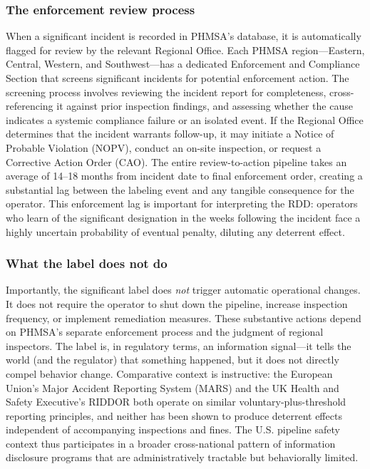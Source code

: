 \documentclass[12pt]{article}
\begin{document}
\subsubsection*{The enforcement review process} When a significant incident is recorded in PHMSA's database, it is automatically flagged for review by the relevant Regional Office. Each PHMSA region---Eastern, Central, Western, and Southwest---has a dedicated Enforcement and Compliance Section that screens significant incidents for potential enforcement action. The screening process involves reviewing the incident report for completeness, cross-referencing it against prior inspection findings, and assessing whether the cause indicates a systemic compliance failure or an isolated event. If the Regional Office determines that the incident warrants follow-up, it may initiate a Notice of Probable Violation (NOPV), conduct an on-site inspection, or request a Corrective Action Order (CAO). The entire review-to-action pipeline takes an average of 14--18 months from incident date to final enforcement order, creating a substantial lag between the labeling event and any tangible consequence for the operator. This enforcement lag is important for interpreting the RDD: operators who learn of the significant designation in the weeks following the incident face a highly uncertain probability of eventual penalty, diluting any deterrent effect.

\subsubsection*{What the label does not do} Importantly, the significant label does \textit{not} trigger automatic operational changes. It does not require the operator to shut down the pipeline, increase inspection frequency, or implement remediation measures. These substantive actions depend on PHMSA's separate enforcement process and the judgment of regional inspectors. The label is, in regulatory terms, an information signal---it tells the world (and the regulator) that something happened, but it does not directly compel behavior change. Comparative context is instructive: the European Union's Major Accident Reporting System (MARS) and the UK Health and Safety Executive's RIDDOR both operate on similar voluntary-plus-threshold reporting principles, and neither has been shown to produce deterrent effects independent of accompanying inspections and fines. The U.S. pipeline safety context thus participates in a broader cross-national pattern of information disclosure programs that are administratively tractable but behaviorally limited.
\end{document}

